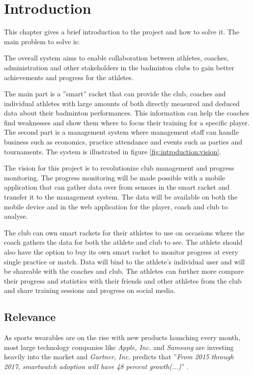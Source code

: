 \chapter{Introduction}
This chapter gives a brief introduction to the project and how to solve it.
The main problem to solve is:


The overall system aims to enable collaboration between athletes, coaches, administration and other stakeholders in the badminton clubs to gain better achievements and progress for the athletes.

The main part is a ''smart'' racket that can provide the club, coaches and individual athletes with large amounts of both directly measured and deduced data about their badminton performances.
This information can help the coaches find weaknesses and show them where to focus their training for a specific player.
The second part is a management system where management staff can handle business such as economics, practice attendance and events such as parties and tournaments.
The system is illustrated in figure \ref{fig:introduction:vision}.


The vision for this project is to revolutionize club management and progress monitoring.
The progress monitoring will be made possible with a mobile application that can gather data over  from sensors in the smart racket and transfer it to the management system.
The data will be available on both the mobile device and in the web application for the player, coach and club to analyse.

The club can own smart rackets for their athletes to use on occasions where the coach gathers the data for both the athlete and club to see.
The athlete should also have the option to buy its own smart racket to monitor progress at every single practice or match.
Data will bind to the athlete's individual user and will be shareable with the coaches and club.
The athletes can further more compare their progress and statistics with their friends and other athletes from the club and share training sessions and progress on social media.

\section{Relevance}
As sports wearables are on the rise with new products launching every month, most large technology companies like \textit{Apple, Inc.} and \textit{Samsung} are investing heavily into the market and \textit{Gartner, Inc.} predicts that ''\textit{From 2015 through 2017, smartwatch adoption will have 48 percent growth(...)}'' \citep{introduction:relevance:gartner}.

